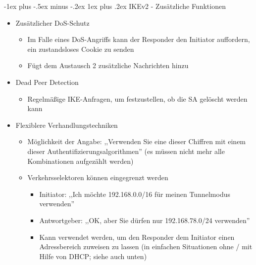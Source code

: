 \documentclass[a4paper]{article}
\makeatletter
\renewcommand{\subsubsection}{\@startsection{subsubsection}{3}{0mm}%
 {-1ex plus -.5ex minus -.2ex}%
 {1ex plus .2ex}%
 {\normalfont\small\bfseries}}
\makeatother
\begin{document}
\begin{multicols}{3}
    \subsubsection{IKEv2 - Zusätzliche
        Funktionen}

    \begin{itemize}
        \item
              Zusätzlicher DoS-Schutz

              \begin{itemize}
                  \item
                        Im Falle eines DoS-Angriffs kann der Responder den Initiator
                        auffordern, ein zustandsloses Cookie zu senden
                  \item
                        Fügt dem Austausch 2 zusätzliche Nachrichten hinzu
              \end{itemize}
        \item
              Dead Peer Detection

              \begin{itemize}
                  \item
                        Regelmäßige IKE-Anfragen, um festzustellen, ob die SA gelöscht
                        werden kann
              \end{itemize}
        \item
              Flexiblere Verhandlungstechniken

              \begin{itemize}
                  \item
                        Möglichkeit der Angabe: ,,Verwenden Sie eine dieser Chiffren mit
                        einem dieser Authentifizierungsalgorithmen'' (es müssen nicht mehr
                        alle Kombinationen aufgezählt werden)
                  \item
                        Verkehrsselektoren können eingegrenzt werden

                        \begin{itemize}
                            \item
                                  Initiator: ,,Ich möchte 192.168.0.0/16 für meinen Tunnelmodus
                                  verwenden''
                            \item
                                  Antwortgeber: ,,OK, aber Sie dürfen nur 192.168.78.0/24
                                  verwenden''
                            \item
                                  Kann verwendet werden, um den Responder dem Initiator einen
                                  Adressbereich zuweisen zu lassen (in einfachen Situationen ohne /
                                  mit Hilfe von DHCP; siehe auch unten)
                        \end{itemize}
              \end{itemize}
    \end{itemize}



\end{multicols}
\end{document}
